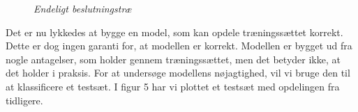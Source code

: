 \documentclass{article}
\begin{document}
\begin{figure}[H]
	\begin{center}
	\end{center}
	\caption{\textit{Endeligt beslutningstræ}}
\end{figure}

Det er nu lykkedes at bygge en model, som kan opdele træningssættet korrekt. Dette er dog ingen garanti for, at modellen er korrekt. Modellen er bygget ud fra nogle antagelser, som holder gennem træningssættet, men det betyder ikke, at det holder i praksis. For at undersøge modellens nøjagtighed, vil vi bruge den til at klassificere et testsæt. I figur 5 har vi plottet et testsæt med opdelingen fra tidligere.
\end{document}
